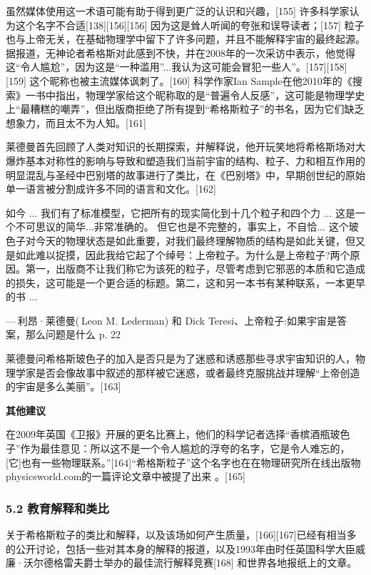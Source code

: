 虽然媒体使用这一术语可能有助于得到更广泛的认识和兴趣，[155] 许多科学家认为这个名字不合适[138][156][156] 因为这是耸人听闻的夸张和误导读者；[157] 粒子也与上帝无关，在基础物理学中留下了许多问题，并且不能解释宇宙的最终起源。据报道，无神论者希格斯对此感到不快，并在2008年的一次采访中表示，他觉得这“令人尴尬”，因为这是“一种滥用”...我认为这可能会冒犯一些人”。[157][158][159] 这个昵称也被主流媒体讽刺了。[160] 科学作家Ian Sample在他2010年的《搜索》一书中指出，物理学家给这个昵称取的是“普遍令人反感”，这可能是物理学史上“最糟糕的嘲弄”，但出版商拒绝了所有提到“希格斯粒子”的书名，因为它们缺乏想象力，而且太不为人知。[161]

莱德曼首先回顾了人类对知识的长期探索，并解释说，他开玩笑地将希格斯场对大爆炸基本对称性的影响与导致和塑造我们当前宇宙的结构、粒子、力和相互作用的明显混乱与圣经中巴别塔的故事进行了类比，在《巴别塔》中，早期创世纪的原始单一语言被分割成许多不同的语言和文化。[162]

如今 ... 我们有了标准模型，它把所有的现实简化到十几个粒子和四个力 ... 这是一个不可思议的简华...非常准确的。 但它也是不完整的，事实上，不自恰... 这个玻色子对今天的物理状态是如此重要，对我们最终理解物质的结构是如此关键，但又是如此难以捉摸，因此我给它起了个绰号：上帝粒子。为什么是上帝粒子?两个原因。第一，出版商不让我们称它为该死的粒子，尽管考虑到它邪恶的本质和它造成的损失，这可能是一个更合适的标题。第二，这和另一本书有某种联系，一本更早的书 ...

— 利昂·莱德曼( Leon M. Lederman) 和 Dick Teresi、上帝粒子:如果宇宙是答案，那么问题是什么 p. 22

莱德曼问希格斯玻色子的加入是否只是为了迷惑和诱惑那些寻求宇宙知识的人，物理学家是否会像故事中叙述的那样被它迷惑，或者最终克服挑战并理解“上帝创造的宇宙是多么美丽”。[163]

\textbf{其他建议}

在2009年英国《卫报》开展的更名比赛上，他们的科学记者选择“香槟酒瓶玻色子”作为最佳意见：所以这不是一个令人尴尬的浮夸的名字，它是令人难忘的，[它]也有一些物理联系。”[164]“希格斯粒子”这个名字也在在物理研究所在线出版物physicsworld.com的一篇评论文章中被提了出来 。[165]

\subsubsection{5.2 教育解释和类比}


关于希格斯粒子的类比和解释，以及该场如何产生质量，[166][167]已经有相当多的公开讨论，包括一些对其本身的解释的报道，以及1993年由时任英国科学大臣威廉·沃尔德格雷夫爵士举办的最佳流行解释竞赛[168] 和世界各地报纸上的文章。

